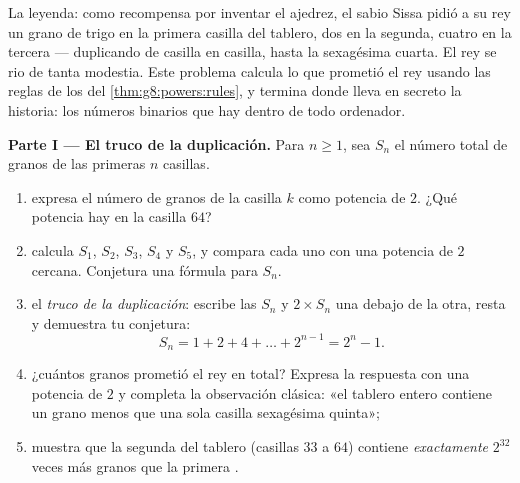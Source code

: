 \begin{problem}[{Problema de fin de semana --- la \omterm{def:g1:addition:def}{suma} geométrica
$1 + 2 + 4 + \dots + 2^{n-1} = 2^n - 1$, de una leyenda famosa a
los números binarios}]
\label{pb:g8:powers:1}
La leyenda: como recompensa por inventar el ajedrez, el sabio Sissa pidió
a su rey un grano de trigo en la primera casilla del tablero,
dos en la segunda, cuatro en la tercera --- duplicando de casilla en
casilla, hasta la sexagésima cuarta. El rey se rio de tanta modestia.
Este problema calcula lo que prometió el rey usando las reglas de los 
del \cref{thm:g8:powers:rules}, y termina donde lleva en secreto la
historia: los números binarios que hay dentro de todo ordenador.

\medskip
\noindent\textbf{Parte I --- El truco de la duplicación.}
Para $n \geq 1$, sea $S_n$ el número total de granos de las
primeras $n$ casillas.
\begin{enumerate}
  \item expresa el número de granos de la casilla $k$ como potencia de
        $2$. ¿Qué potencia hay en la casilla $64$?
  \item calcula $S_1$, $S_2$, $S_3$, $S_4$ y $S_5$, y compara
        cada uno con una potencia de $2$ cercana. Conjetura una fórmula para
        $S_n$.
  \item el \emph{truco de la duplicación}: escribe las  $S_n$ y
        $2 \times S_n$ una debajo de la otra, resta y demuestra
        tu conjetura:
        \[
        S_n = 1 + 2 + 4 + \dots + 2^{n-1} = 2^n - 1 .
        \]
  \item ¿cuántos granos prometió el rey en total? Expresa la
        respuesta con una potencia de $2$ y completa la
        observación clásica: «el tablero entero contiene un grano menos que
        una sola casilla sexagésima quinta»;
  \item muestra que la segunda  del tablero (casillas $33$ a
        $64$) contiene \emph{exactamente} $2^{32}$ veces más granos
        que la primera .
\end{enumerate}


\end{problem}
